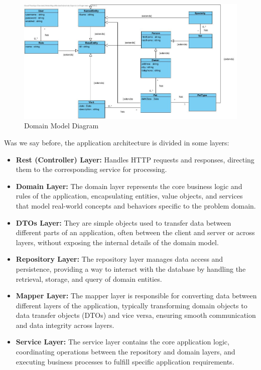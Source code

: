 \documentclass[a4paper,11pt,openright,BCOR=15mm]{scrbook}
\begin{document}
		\begin{figure}[H]
			\includegraphics[width=\textwidth]{figs/MD.jpg}
			\caption{Domain Model Diagram}
			\label{fig:Domain Model Diagram}
			\centering
		\end{figure}
		
		Was we say before, the application architecture is divided in some layers:
		\begin{itemize}
			\item \textbf{Rest (Controller) Layer:} Handles HTTP requests and responses, directing them to the corresponding service for processing.
			
			\item \textbf{Domain Layer:} The domain layer represents the core business logic and rules of the application, encapsulating entities, value objects, and services that model real-world concepts and behaviors specific to the problem domain.
			
			\item \textbf{DTOs Layer:} They are simple objects used to transfer data between different parts of an application, often between the client and server or across layers, without exposing the internal details of the domain model.
			
			\item \textbf{Repository Layer:} The repository layer manages data access and persistence, providing a way to interact with the database by handling the retrieval, storage, and query of domain entities.
			
			\item \textbf{Mapper Layer:} The mapper layer is responsible for converting data between different layers of the application, typically transforming domain objects to data transfer objects (DTOs) and vice versa, ensuring smooth communication and data integrity across layers.
			
			\item \textbf{Service Layer:} The service layer contains the core application logic, coordinating operations between the repository and domain layers, and executing business processes to fulfill specific application requirements.
			
		\end{itemize}
		
\end{document}

